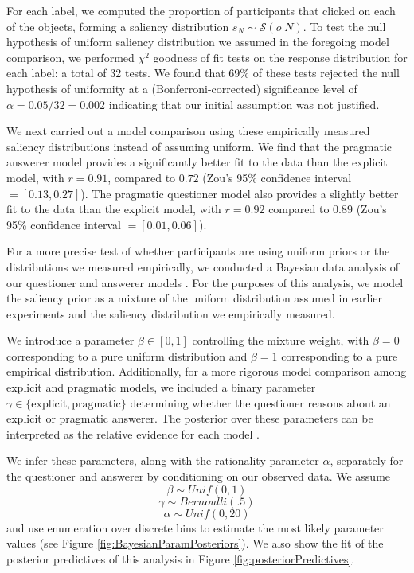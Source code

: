 \documentclass[12pt, floatsintext, jou]{apa6}
\begin{document}
For each label, we computed the proportion of participants that clicked on each of the objects, forming a saliency distribution $s_N \sim \mathcal{S}(o | N)$. To test the null hypothesis of uniform saliency distribution we assumed in the foregoing model comparison, we performed $\chi^2$ goodness of fit tests on the response distribution for each label: a total of 32 tests. We found that 69\% of these tests rejected the null hypothesis of uniformity at a (Bonferroni-corrected) significance level of $\alpha = 0.05/32 = 0.002$ indicating that our initial assumption was not justified. 

We next carried out a model comparison using these empirically measured saliency distributions instead of assuming uniform. We find that the pragmatic answerer model provides a significantly better fit to the data than the explicit model, with $r=0.91$, compared to $0.72$ (Zou's 95\% confidence interval $= [0.13, 0.27]$). The pragmatic questioner model also provides a slightly better fit to the data than the explicit model, with $r = 0.92$ compared to $0.89$ (Zou's 95\% confidence interval $= [0.01, 0.06]$). 

For a more precise test of whether participants are using uniform priors or the distributions we measured empirically, we conducted a Bayesian data analysis of our questioner and answerer models \cite{HemmerTauberSteyvers15_BDAplus}. For the purposes of this analysis, we model the saliency prior as a mixture of the uniform distribution assumed in earlier experiments and the saliency distribution we empirically measured. 

We introduce a parameter $\beta \in [0,1]$ controlling the mixture weight, with $\beta = 0$ corresponding to a pure uniform distribution and $\beta = 1$ corresponding to a pure empirical distribution. Additionally, for a more rigorous model comparison among explicit and pragmatic models, we included a binary parameter $\gamma \in \{\textrm{explicit}, \textrm{pragmatic}\}$ determining whether the questioner reasons about an explicit or pragmatic answerer. The posterior over these parameters can be interpreted as the relative evidence for each model \cite{KruschkeVanPaemel15_OxfordHandbook}.

We infer these parameters, along with the rationality parameter $\alpha$, separately for the questioner and answerer by conditioning on our observed data. We assume $$\beta \sim Unif(0,1)$$ $$\gamma \sim Bernoulli(.5)$$ $$\alpha \sim Unif(0,20)$$ and use enumeration over discrete bins to estimate the most likely parameter values (see Figure \ref{fig:BayesianParamPosteriors}). We also show the fit of the posterior predictives of this analysis in Figure \ref{fig:posteriorPredictives}.
\end{document}
